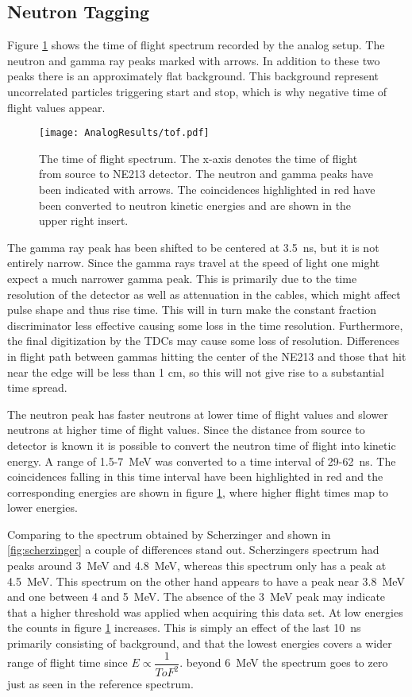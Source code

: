 \documentclass[main.tex]{subfiles}
\begin{document}
\subsection{Neutron Tagging}
Figure \ref{fig:tof_a} shows the time of flight spectrum recorded by the analog setup. The neutron and gamma ray peaks marked with arrows. In addition to these two peaks there is an approximately flat background. This background represent uncorrelated particles triggering start and stop, which is why negative time of flight values appear.
\begin{figure}[ht]
    \centering
        \texttt{[image: AnalogResults/tof.pdf]}
        \caption[Time of flight spectrum, analog setup.]{The time of flight spectrum. The x-axis denotes the time of flight from source to NE213 detector. The neutron and gamma peaks have been indicated with arrows. The coincidences highlighted in red have been converted to neutron kinetic energies and are shown in the upper right insert.}
    \label{fig:tof_a}
\end{figure}

The gamma ray peak has been shifted to be centered at \SI{3.5}{ns}, but it is not entirely narrow. Since the gamma rays travel at the speed of light one might expect a much narrower gamma peak. This is primarily due to the time resolution of the detector as well as attenuation in the cables, which might affect pulse shape and thus rise time. This will in turn make the constant fraction discriminator less effective causing some loss in the time resolution. Furthermore, the final  digitization by the TDCs may cause some loss of resolution. Differences in flight path between gammas hitting the center of the NE213 and those that hit near the edge will be less than 1 cm, so this will not give rise to a substantial time spread. 

The neutron peak has faster neutrons at lower time of flight values and slower neutrons at higher time of flight values. Since the distance from source to detector is known it is possible to convert the neutron time of flight into kinetic energy. A range of 1.5-\SI{7}{\MeV} was converted to a time interval of 29-\SI{62}{\ns}. The coincidences falling in this time interval have been highlighted in red and the corresponding energies are shown in figure \ref{fig:tof_a}, where higher flight times map to lower energies.

Comparing to the spectrum obtained by Scherzinger\cite{ScherzingerPhd} and shown in \ref{fig:scherzinger} a couple of differences stand out. Scherzingers spectrum had peaks around \SI{3}{\MeV} and \SI{4.8}{\MeV}, whereas this spectrum only has a peak at \SI{4.5}{\MeV}. This spectrum on the other hand appears to have a peak near \SI{3.8}{\MeV} and one between 4 and \SI{5}{\MeV}. The absence of the \SI{3}{\MeV} peak may indicate that a higher threshold was applied when acquiring this data set. At low energies the counts in figure \ref{fig:tof_a} increases. This is simply an effect of the last \SI{10}{\ns} primarily consisting of background, and that the lowest energies covers a wider range of flight time since $E\propto \dfrac{1}{ToF^2}$. beyond \SI{6}{\MeV} the spectrum goes to zero just as seen in the reference spectrum.
\end{document}
